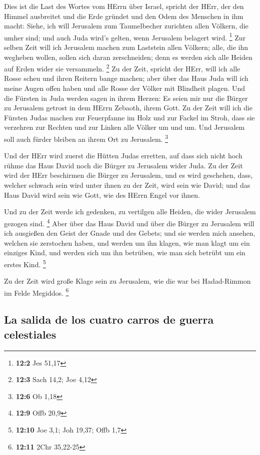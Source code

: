 Dies ist die Last des Wortes vom HErrn über Israel,
spricht der HErr, der den Himmel ausbreitet und die Erde gründet und den
Odem des Menschen in ihm macht:  Siehe, ich will Jerusalem
zum Taumelbecher zurichten allen Völkern, die umher sind; und auch Juda
wird's gelten, wenn Jerusalem belagert wird. \footnote{\textbf{12:2} Jes
  51,17}  Zur selben Zeit will ich Jerusalem machen zum
Laststein allen Völkern; alle, die ihn wegheben wollen, sollen sich
daran zerschneiden; denn es werden sich alle Heiden auf Erden wider sie
versammeln. \footnote{\textbf{12:3} Sach 14,2; Joe 4,12} 
Zu der Zeit, spricht der HErr, will ich alle Rosse scheu und ihren
Reitern bange machen; aber über das Haus Juda will ich meine Augen offen
haben und alle Rosse der Völker mit Blindheit plagen.  Und
die Fürsten in Juda werden sagen in ihrem Herzen: Es seien mir nur die
Bürger zu Jerusalem getrost in dem HErrn Zebaoth, ihrem Gott.
 Zu der Zeit will ich die Fürsten Judas machen zur
Feuerpfanne im Holz und zur Fackel im Stroh, dass sie verzehren zur
Rechten und zur Linken alle Völker um und um. Und Jerusalem soll auch
fürder bleiben an ihrem Ort zu Jerusalem. \footnote{\textbf{12:6} Ob
  1,18}

 Und der HErr wird zuerst die Hütten Judas erretten, auf
dass sich nicht hoch rühme das Haus David noch die Bürger zu Jerusalem
wider Juda.  Zu der Zeit wird der HErr beschirmen die
Bürger zu Jerusalem, und es wird geschehen, dass, welcher schwach sein
wird unter ihnen zu der Zeit, wird sein wie David; und das Haus David
wird sein wie Gott, wie des HErrn Engel vor ihnen.

 Und zu der Zeit werde ich gedenken, zu vertilgen alle
Heiden, die wider Jerusalem gezogen sind. \footnote{\textbf{12:9} Offb
  20,9}  Aber über das Haus David und über die Bürger zu
Jerusalem will ich ausgießen den Geist der Gnade und des Gebets; und sie
werden mich ansehen, welchen sie zerstochen haben, und werden um ihn
klagen, wie man klagt um ein einziges Kind, und werden sich um ihn
betrüben, wie man sich betrübt um ein erstes Kind. \footnote{\textbf{12:10}
  Joe 3,1; Joh 19,37; Offb 1,7}

 Zu der Zeit wird große Klage sein zu Jerusalem, wie die
war bei Hadad-Rimmon im Felde Megiddos. \footnote{\textbf{12:11} 2Chr
  35,22-25}

\hypertarget{la-salida-de-los-cuatro-carros-de-guerra-celestiales}{%
\subsection{La salida de los cuatro carros de guerra
celestiales}\label{la-salida-de-los-cuatro-carros-de-guerra-celestiales}}

